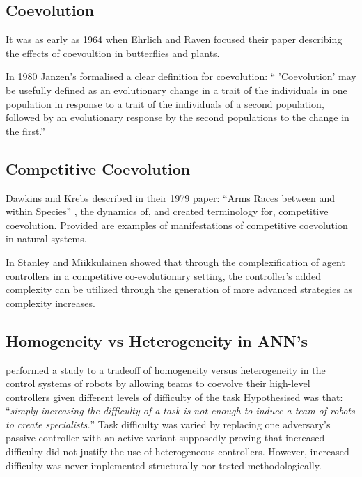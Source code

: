 \documentclass[conference]{IEEEtran}
\begin{document}
\subsection{Coevolution}
It was as early as 1964 when Ehrlich and Raven focused their paper \cite{ehrlich1964butterflies} describing the effects of coevoultion in butterflies and plants.

In 1980 Janzen's \cite{janzen1980coevolution} formalised a clear definition for coevolution:
`` 'Coevolution' may be usefully defined as an evolutionary change in a trait of the individuals in one population in response to a trait of the individuals of a second population, followed by an evolutionary response by the second populations to the change in the first.''


\subsection{Competitive Coevolution}
Dawkins and Krebs described in their 1979 paper: ``Arms Races between and within Species'' \cite{dawkins1979arms}, the dynamics of, and created terminology for, competitive coevolution. Provided are examples of manifestations of competitive coevolution in natural systems.

In \cite{stanley2004competitive} Stanley and Miikkulainen showed that through the complexification of agent controllers in a competitive co-evolutionary setting, the controller's added complexity can be utilized through the generation of more advanced strategies as complexity increases.


\subsection{Homogeneity vs Heterogeneity in ANN's}
\cite{potter2001heterogeneity} performed a study to a tradeoff of homogeneity versus heterogeneity in the control systems of robots by allowing teams to coevolve their high-level controllers given different levels of difficulty of the task
Hypothesised was that: ``\textit{simply increasing the difficulty of a task is not enough to induce a team of robots to create specialists.}''
Task difficulty was varied by replacing one adversary's passive controller with an active variant supposedly proving that increased difficulty did not justify the use of heterogeneous controllers.
However, increased difficulty was never implemented structurally nor tested methodologically. 
\end{document}
